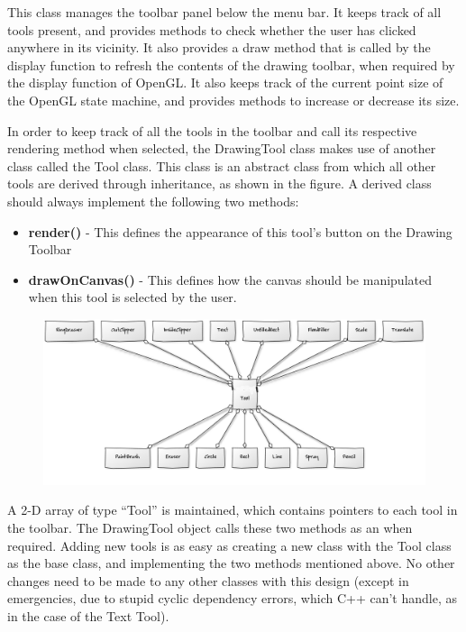\documentclass[12pt]{report}
\begin{document}
This class manages the toolbar panel below the menu bar. It keeps track of all tools present, and provides methods to check whether the user has clicked anywhere in its vicinity. It also provides a draw method that is called by the display function to refresh the contents of the drawing toolbar, when required by the display function of OpenGL. It also keeps track of the current point size of the OpenGL state machine, and provides methods to increase or decrease its size.

In order to keep track of all the tools in the toolbar and call its respective rendering method when selected, the DrawingTool class makes use of another class called the Tool class. This class is an abstract class from which all other tools are derived through inheritance, as shown in the figure. A derived class should always implement the following two methods:
\begin{itemize}
\item{\textbf{render()} - This defines the appearance of this tool’s button on the Drawing Toolbar}
\item{\textbf{drawOnCanvas()} - This defines how the canvas should be manipulated when this tool is selected by the user.}
\end{itemize}

\begin{figure}[h!]
	\centering
		\includegraphics[scale=0.6]{tool.png}
\end{figure}


A 2-D array of type “Tool” is maintained, which contains pointers to each tool in the toolbar. The DrawingTool object calls these two methods as an when required. Adding new tools is as easy as creating a new class with the Tool class as the base class, and implementing the two methods mentioned above. No other changes need to be made to any other classes with this design (except in emergencies, due to stupid cyclic dependency errors, which C++ can’t handle, as in the case of the Text Tool).
\end{document}
